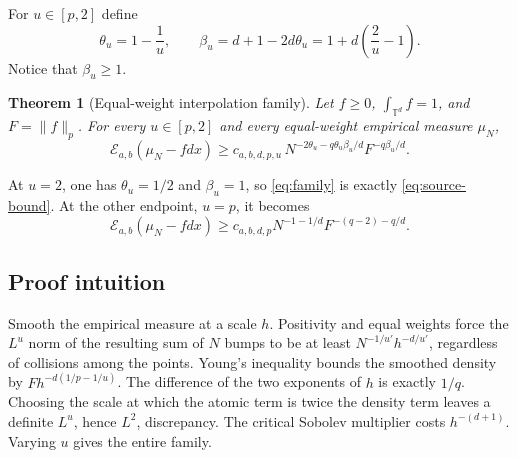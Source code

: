 \documentclass[11pt]{article}
\newtheorem{theorem}{Theorem}
\newcommand{\T}{\mathbb T}
\newcommand{\Ecal}{\mathcal E}
\begin{document}
For $u\in[p,2]$ define
\[
 \theta_u=1-\frac1u,
 \qquad
 \beta_u=d+1-2d\theta_u
           =1+d\left(\frac2u-1\right).
\]
Notice that $\beta_u\ge1$.

\begin{theorem}[Equal-weight interpolation family]\label{thm:interpolation}
Let $f\ge0$, $\int_{\T^d}f=1$, and $F=\|f\|_p$.  For every
$u\in[p,2]$ and every equal-weight empirical measure $\mu_N$,
\begin{equation}\label{eq:family}
 \Ecal_{a,b}(\mu_N-fdx)
 \ge c_{a,b,d,p,u}\,
 N^{-2\theta_u-q\theta_u\beta_u/d}
 F^{-q\beta_u/d}.
\end{equation}
\end{theorem}

At $u=2$, one has $\theta_u=1/2$ and $\beta_u=1$, so
\eqref{eq:family} is exactly \eqref{eq:source-bound}.  At the other endpoint,
$u=p$, it becomes
\begin{equation}\label{eq:p-endpoint}
 \Ecal_{a,b}(\mu_N-fdx)
 \ge c_{a,b,d,p}
 N^{-1-1/d}F^{-(q-2)-q/d}.
\end{equation}

\subsection*{Proof intuition}
Smooth the empirical measure at a scale $h$.  Positivity and equal weights
force the $L^u$ norm of the resulting sum of $N$ bumps to be at least
$N^{-1/u'}h^{-d/u'}$, regardless of collisions among the points.  Young's
inequality bounds the smoothed density by
$Fh^{-d(1/p-1/u)}$.  The difference of the two exponents of $h$ is exactly
$1/q$.  Choosing the scale at which the atomic term is twice the density
term leaves a definite $L^u$, hence $L^2$, discrepancy.  The critical
Sobolev multiplier costs $h^{-(d+1)}$.  Varying $u$ gives the entire family.
\end{document}

